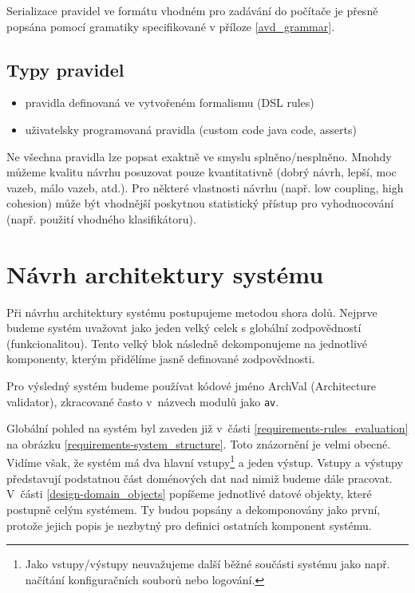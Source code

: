 
Serializace pravidel ve formátu vhodném pro zadávání do počítače je přesně popsána pomocí gramatiky specifikované v příloze \ref{avd_grammar}.

\subsection{Typy pravidel}
\begin{itemize}
\item pravidla definovaná ve vytvořeném formalismu (DSL rules)
\item uživatelsky programovaná pravidla (custom code java code, asserts)
\end{itemize}

Ne všechna pravidla lze popsat exaktně ve smyslu splněno/nesplněno. Mnohdy můžeme kvalitu návrhu posuzovat pouze kvantitativně (dobrý návrh, lepší, moc vazeb, málo vazeb, atd.). Pro některé vlastnosti návrhu (např. low coupling, high cohesion) může být vhodnější poskytnou statistický přístup pro vyhodnocování (např. použití vhodného klasifikátoru).

\section{Návrh architektury systému}
\label{design-architecture}

Při návrhu architektury systému postupujeme metodou shora dolů. Nejprve budeme systém uvažovat jako jeden velký celek s globální zodpovědností (funkcionalitou). Tento velký blok následně dekomponujeme na jednotlivé komponenty, kterým přidělíme jasně definované zodpovědnosti.

Pro výsledný systém budeme používat kódové jméno ArchVal (Architecture validator), zkracované často v~názvech modulů jako \verb+av+.

Globální pohled na systém byl zaveden již v~části \ref{requirements-rules_evaluation} na obrázku \ref{requirements-system_structure}. Toto znázornění je velmi obecné. Vidíme však, že systém má dva hlavní vstupy\footnote{Jako vstupy/výstupy neuvažujeme další běžné součásti systému jako např. načítání konfiguračních souborů nebo logování.} a jeden výstup. Vstupy a výstupy představují podstatnou část doménových dat nad nimiž budeme dále pracovat. V~části \ref{design-domain_objects} popíšeme jednotlivé datové objekty, které postupně  celým systémem. Ty budou popsány a dekomponovány jako první, protože jejich popis je nezbytný pro definici ostatních komponent systému.

